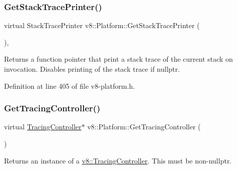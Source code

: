 \mbox{\label{classv8_1_1Platform_aadb2594e6ff9a6f6a0657412ff5a7206}} 
\subsubsection{\texorpdfstring{Get\+Stack\+Trace\+Printer()}{GetStackTracePrinter()}}
{\footnotesize\ttfamily virtual Stack\+Trace\+Printer v8\+::\+Platform\+::\+Get\+Stack\+Trace\+Printer (\begin{DoxyParamCaption}{ }\end{DoxyParamCaption})\hspace{0.3cm}{\ttfamily [inline]}, {\ttfamily [virtual]}}

Returns a function pointer that print a stack trace of the current stack on invocation. Disables printing of the stack trace if nullptr. 

Definition at line 405 of file v8-\/platform.\+h.

\mbox{\label{classv8_1_1Platform_aa760c7bf8c46495eb650d2be72399747}} 
\subsubsection{\texorpdfstring{Get\+Tracing\+Controller()}{GetTracingController()}}
{\footnotesize\ttfamily virtual \mbox{\hyperlink{classv8_1_1TracingController}{Tracing\+Controller}}$\ast$ v8\+::\+Platform\+::\+Get\+Tracing\+Controller (\begin{DoxyParamCaption}{ }\end{DoxyParamCaption})\hspace{0.3cm}{\ttfamily [pure virtual]}}

Returns an instance of a \mbox{\hyperlink{classv8_1_1TracingController}{v8\+::\+Tracing\+Controller}}. This must be non-\/nullptr. \mbox{\label{classv8_1_1Platform_ad229642bf16a066d2e8d866dc128141e}} 

